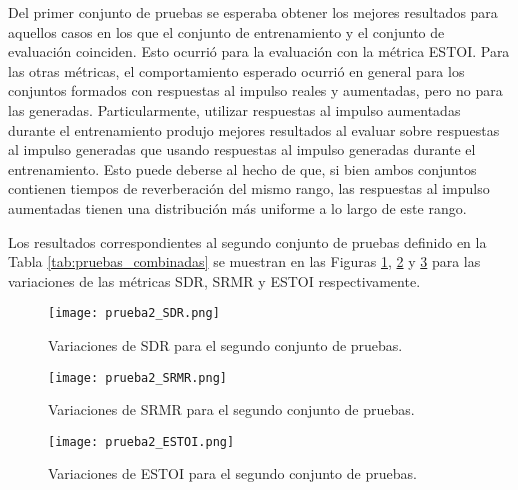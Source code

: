 Del primer conjunto de pruebas se esperaba obtener los mejores resultados para aquellos casos en los que el conjunto de entrenamiento y el conjunto de evaluación coinciden. Esto ocurrió para la evaluación con la métrica ESTOI. Para las otras métricas, el comportamiento esperado ocurrió en general para los conjuntos formados con respuestas al impulso reales y aumentadas, pero no para las generadas. Particularmente, utilizar respuestas al impulso aumentadas durante el entrenamiento produjo mejores resultados al evaluar sobre respuestas al impulso generadas que usando respuestas al impulso generadas durante el entrenamiento. Esto puede deberse al hecho de que, si bien ambos conjuntos contienen tiempos de reverberación del mismo rango, las respuestas al impulso aumentadas tienen una distribución más uniforme a lo largo de este rango.

Los resultados correspondientes al segundo conjunto de pruebas definido en la Tabla \ref{tab:pruebas_combinadas} se muestran en las Figuras \ref{fig:2_SDR}, \ref{fig:2_SRMR} y \ref{fig:2_ESTOI} para las variaciones de las métricas SDR, SRMR y ESTOI respectivamente.

\begin{figure}[H]
	\centering{}
	\texttt{[image: prueba2\_SDR.png]}
	\caption{Variaciones de SDR para el segundo conjunto de pruebas.}
	\label{fig:2_SDR}
\end{figure}

\begin{figure}[H]
	\centering{}
	\texttt{[image: prueba2\_SRMR.png]}
	\caption{Variaciones de SRMR para el segundo conjunto de pruebas.}
	\label{fig:2_SRMR}
\end{figure}

\begin{figure}[H]
	\centering{}
	\texttt{[image: prueba2\_ESTOI.png]}
	\caption{Variaciones de ESTOI para el segundo conjunto de pruebas.}
	\label{fig:2_ESTOI}
\end{figure}

